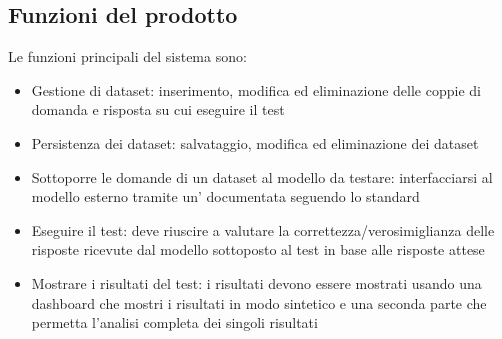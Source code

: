 
\subsection{Funzioni del prodotto}
Le funzioni principali del sistema sono:
\begin{itemize}
    \item Gestione di dataset: inserimento, modifica ed eliminazione delle coppie di domanda e risposta su cui eseguire il test
    \item Persistenza dei dataset: salvataggio, modifica ed eliminazione dei dataset
    \item Sottoporre le domande di un dataset al modello da testare: interfacciarsi al modello esterno tramite un' documentata seguendo lo standard 
    \item Eseguire il test: deve riuscire a valutare la correttezza/verosimiglianza delle risposte ricevute dal modello sottoposto al test in base alle risposte attese
    \item Mostrare i risultati del test: i risultati devono essere mostrati usando una dashboard che mostri i risultati in modo sintetico e una seconda parte che permetta l'analisi completa dei singoli risultati
\end{itemize}